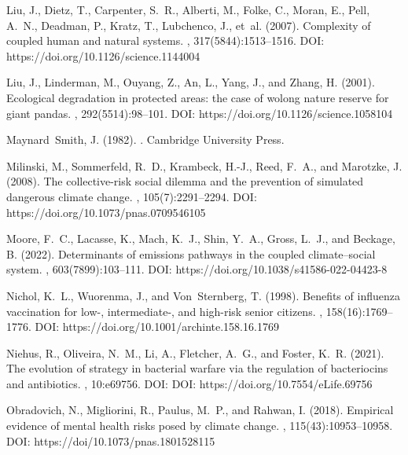 \documentclass[9pt]{elife}
\begin{document}
\begin{thebibliography}{}
Liu, J., Dietz, T., Carpenter, S.~R., Alberti, M., Folke, C., Moran, E., Pell,
  A.~N., Deadman, P., Kratz, T., Lubchenco, J., et~al. (2007).
\newblock Complexity of coupled human and natural systems.
, 317(5844):1513--1516. DOI: https://doi.org/10.1126/science.1144004

Liu, J., Linderman, M., Ouyang, Z., An, L., Yang, J., and Zhang, H. (2001).
\newblock Ecological degradation in protected areas: the case of wolong nature
  reserve for giant pandas.
, 292(5514):98--101. DOI: https://doi.org/10.1126/science.1058104

Maynard~Smith, J. (1982).
.
\newblock Cambridge University Press.

Milinski, M., Sommerfeld, R.~D., Krambeck, H.-J., Reed, F.~A., and Marotzke, J.
  (2008).
\newblock The collective-risk social dilemma and the prevention of simulated
  dangerous climate change.
, 105(7):2291--2294. DOI: https://doi.org/10.1073/pnas.0709546105

Moore, F.~C., Lacasse, K., Mach, K.~J., Shin, Y.~A., Gross, L.~J., and Beckage,
  B. (2022).
\newblock Determinants of emissions pathways in the coupled climate--social
  system.
, 603(7899):103--111. DOI: https://doi.org/10.1038/s41586-022-04423-8

Nichol, K.~L., Wuorenma, J., and Von~Sternberg, T. (1998).
\newblock Benefits of influenza vaccination for low-, intermediate-, and
  high-risk senior citizens.
, 158(16):1769--1776. DOI: https://doi.org/10.1001/archinte.158.16.1769

Niehus, R., Oliveira, N.~M., Li, A., Fletcher, A.~G., and Foster, K.~R. (2021).
\newblock The evolution of strategy in bacterial warfare via the regulation of
  bacteriocins and antibiotics.
, 10:e69756. DOI: DOI: https://doi.org/10.7554/eLife.69756

Obradovich, N., Migliorini, R., Paulus, M.~P., and Rahwan, I. (2018).
\newblock Empirical evidence of mental health risks posed by climate change.
, 115(43):10953--10958. DOI: https://doi/10.1073/pnas.1801528115


\end{thebibliography}
\end{document}
